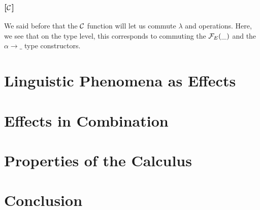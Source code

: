 \documentclass{llncs}
\begin{document}
\subsubsection*{[$\mathcal{C}$]}

We said before that the $\mathcal{C}$ function will let us commute $\lambda$ and
operations. Here, we see that on the type level, this corresponds to
commuting the $\mathcal{F}_E(\_)$ and the $\alpha \to \_$ type constructors.




\section{Linguistic Phenomena as Effects}
\label{sec:phenomena}


\section{Effects in Combination}
\label{sec:combination}


\section{Properties of the Calculus}
\label{sec:properties}


\section{Conclusion}
\label{sec:conclusion}

%
%


\end{document}
